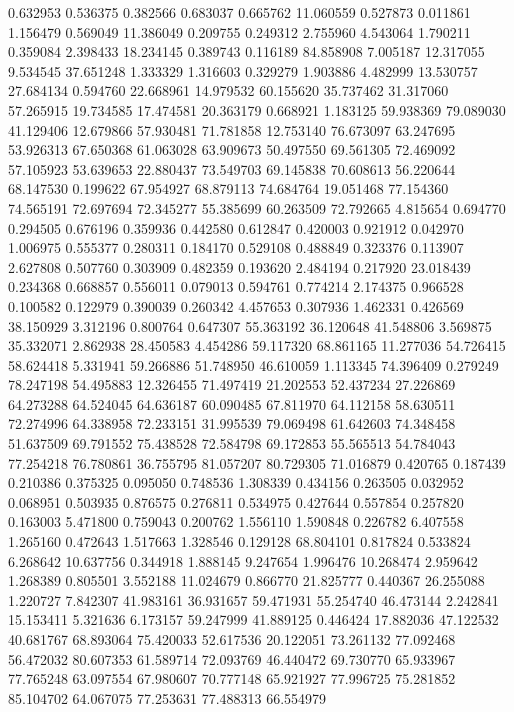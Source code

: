 0.632953
0.536375
0.382566
0.683037
0.665762
11.060559
0.527873
0.011861
1.156479
0.569049
11.386049
0.209755
0.249312
2.755960
4.543064
1.790211
0.359084
2.398433
18.234145
0.389743
0.116189
84.858908
7.005187
12.317055
9.534545
37.651248
1.333329
1.316603
0.329279
1.903886
4.482999
13.530757
27.684134
0.594760
22.668961
14.979532
60.155620
35.737462
31.317060
57.265915
19.734585
17.474581
20.363179
0.668921
1.183125
59.938369
79.089030
41.129406
12.679866
57.930481
71.781858
12.753140
76.673097
63.247695
53.926313
67.650368
61.063028
63.909673
50.497550
69.561305
72.469092
57.105923
53.639653
22.880437
73.549703
69.145838
70.608613
56.220644
68.147530
0.199622
67.954927
68.879113
74.684764
19.051468
77.154360
74.565191
72.697694
72.345277
55.385699
60.263509
72.792665
4.815654
0.694770
0.294505
0.676196
0.359936
0.442580
0.612847
0.420003
0.921912
0.042970
1.006975
0.555377
0.280311
0.184170
0.529108
0.488849
0.323376
0.113907
2.627808
0.507760
0.303909
0.482359
0.193620
2.484194
0.217920
23.018439
0.234368
0.668857
0.556011
0.079013
0.594761
0.774214
2.174375
0.966528
0.100582
0.122979
0.390039
0.260342
4.457653
0.307936
1.462331
0.426569
38.150929
3.312196
0.800764
0.647307
55.363192
36.120648
41.548806
3.569875
35.332071
2.862938
28.450583
4.454286
59.117320
68.861165
11.277036
54.726415
58.624418
5.331941
59.266886
51.748950
46.610059
1.113345
74.396409
0.279249
78.247198
54.495883
12.326455
71.497419
21.202553
52.437234
27.226869
64.273288
64.524045
64.636187
60.090485
67.811970
64.112158
58.630511
72.274996
64.338958
72.233151
31.995539
79.069498
61.642603
74.348458
51.637509
69.791552
75.438528
72.584798
69.172853
55.565513
54.784043
77.254218
76.780861
36.755795
81.057207
80.729305
71.016879
0.420765
0.187439
0.210386
0.375325
0.095050
0.748536
1.308339
0.434156
0.263505
0.032952
0.068951
0.503935
0.876575
0.276811
0.534975
0.427644
0.557854
0.257820
0.163003
5.471800
0.759043
0.200762
1.556110
1.590848
0.226782
6.407558
1.265160
0.472643
1.517663
1.328546
0.129128
68.804101
0.817824
0.533824
6.268642
10.637756
0.344918
1.888145
9.247654
1.996476
10.268474
2.959642
1.268389
0.805501
3.552188
11.024679
0.866770
21.825777
0.440367
26.255088
1.220727
7.842307
41.983161
36.931657
59.471931
55.254740
46.473144
2.242841
15.153411
5.321636
6.173157
59.247999
41.889125
0.446424
17.882036
47.122532
40.681767
68.893064
75.420033
52.617536
20.122051
73.261132
77.092468
56.472032
80.607353
61.589714
72.093769
46.440472
69.730770
65.933967
77.765248
63.097554
67.980607
70.777148
65.921927
77.996725
75.281852
85.104702
64.067075
77.253631
77.488313
66.554979
